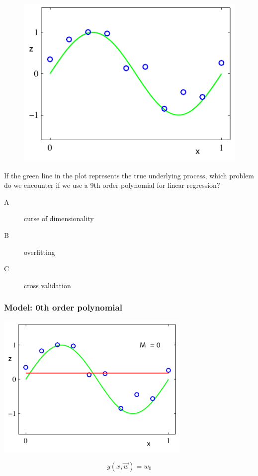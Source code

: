 \documentclass[USenglish,pdftex,compress,10pt,svgnamesi,handout]{beamer}
\begin{document}
\begin{poll}
\begin{figure}
	\centering
	\includegraphics[width=0.6\linewidth]{pics/linreg-Figure1_2}
\end{figure}
If the green line in the plot represents the true underlying process, which problem do we encounter if we use a 9th order polynomial for linear regression?
	\begin{description}
		\item[A] curse of dimensionality
		\item[B] overfitting
		\item[C] cross validation
	\end{description}

\end{poll}
\begin{frame}
    \frametitle{Model: 0th order polynomial}
    
\begin{center}
	\includegraphics[width=0.7\textwidth]{pics/linreg-Figure1_4a}
	
	\alert{\[y(x,\Vec{w}) = w_0\]}
\end{center}
\end{frame}
\end{document}
